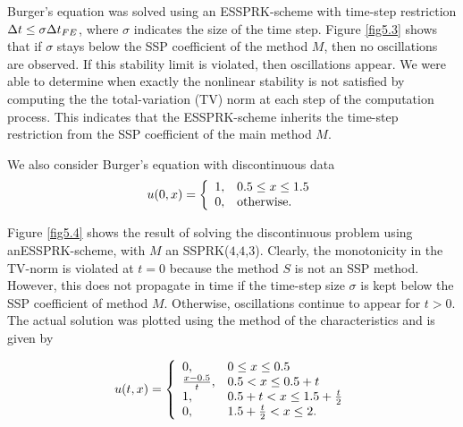 Burger's equation was solved using an ESSPRK-scheme with time-step restriction $\Delta t \leq \sigma{\Delta t}_{FE}$, where $\sigma$ indicates the size of the time step. Figure \ref{fig5.3} shows that if $\sigma$ stays below the SSP coefficient of the method $M$, then no oscillations are observed. If this stability limit is violated, then oscillations appear.  We were able to determine when exactly the nonlinear stability is not satisfied by computing the the total-variation (TV) norm at each step of the computation process. This indicates that the ESSPRK-scheme inherits the time-step restriction from the SSP coefficient of the main method $M$.
\newline

We also consider Burger's equation with discontinuous data
\begin{equation}\label{eq5.8}
    u(0,x)  = \left\{
                \begin{array}{ll}
                  1, & \hbox{$0.5 \leq x \leq 1.5$} \\
                  0, & \hbox{otherwise.}
                \end{array}
              \right.
\end{equation}

Figure \ref{fig5.4} shows the result of solving the discontinuous problem using anESSPRK-scheme, with $M$ an SSPRK($4$,$4$,$3$). Clearly, the monotonicity in the TV-norm is violated at $t = 0$ because the method $S$ is not an SSP method. However, this does not propagate in time if the time-step size $\sigma$ is kept below the SSP coefficient of method $M$. Otherwise, oscillations continue to appear for $t > 0$. The actual solution was plotted using the method of the characteristics and is given by

\begin{equation}\label{eq5.9}
    u(t,x)  = \left\{
                \begin{array}{ll}
                  0, & \hbox{$0 \leq x \leq 0.5$} \\
                  \frac{x-0.5}{t}, & \hbox{$0.5 < x \leq 0.5 + t$} \\
                  1, & \hbox{$0.5 + t < x \leq 1.5  + \frac{t}{2}$} \\
                  0, & \hbox{$1.5  + \frac{t}{2} < x \leq 2$}. \\
                \end{array}
              \right.
\end{equation}

